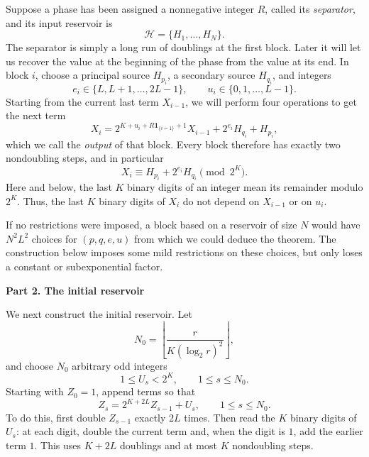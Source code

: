 \documentclass{article}
\theoremstyle{definition}
\begin{document}
Suppose a phase has been assigned a nonnegative integer $R$, called its
\emph{separator}, and its input reservoir is
$$
 \mathcal H=\{H_1,\ldots,H_N\}.
$$
The separator is simply a long run of doublings at the first block. Later it
will let us recover the value at the beginning of the phase from the value at
its end.
In block $i$, choose a principal source $H_{p_i}$, a secondary source
$H_{q_i}$, and integers
$$
 e_i\in\{L,L+1,\ldots,2L-1\},
 \qquad
 u_i\in\{0,1,\ldots,L-1\}.
$$
Starting from the current last term $X_{i-1}$, we will perform four
operations to get the next term
\begin{equation}
 X_i=
 2^{K+u_i+R\mathbf 1_{\{i=1\}}+1}X_{i-1}
 +2^{e_i}H_{q_i}+H_{p_i},
 \label{eq:F-new-block}
\end{equation}
which we call the
\emph{output} of that block.
Every block therefore has exactly two nondoubling steps, and in particular
\begin{equation}
 X_i\equiv H_{p_i}+2^{e_i}H_{q_i}\pmod {2^K}.
 \label{eq:F-new-low-bits}
\end{equation}
Here and below, the last $K$ binary digits of an integer mean its remainder
modulo $2^K$.
Thus, the last $K$ binary digits of $X_i$ do not depend on $X_{i-1}$ or on
$u_i$.

If no restrictions were imposed, a block based on a reservoir of size $N$ would have $N^2L^2$ choices for $(p,q,e,u)$ from which we could deduce the theorem. The construction below imposes some mild restrictions on these choices, but only loses a constant or subexponential factor.


\vskip 10pt

\noindent
{\bf Part 2. The initial reservoir}

We next construct the initial reservoir. Let
$$
N_0=\left\lfloor\frac{r}{K(\log_2r)^2}\right\rfloor,
$$
and choose $N_0$ arbitrary odd integers
$$
 1\leq U_s<2^K,
 \qquad 1\leq s\leq N_0.
$$
Starting with $Z_0=1$, append terms so that
\begin{equation}
 Z_s=2^{K+2L}Z_{s-1}+U_s,
 \qquad 1\leq s\leq N_0.
 \label{eq:F-new-seeds}
\end{equation}
To do this, first double $Z_{s-1}$ exactly $2L$ times.  
Then read the $K$ binary
digits of $U_s$: at each digit, double the current term and, when the digit is
$1$, add the earlier term $1$.  This uses $K+2L$ doublings and at most $K$
nondoubling steps.
\end{document}

